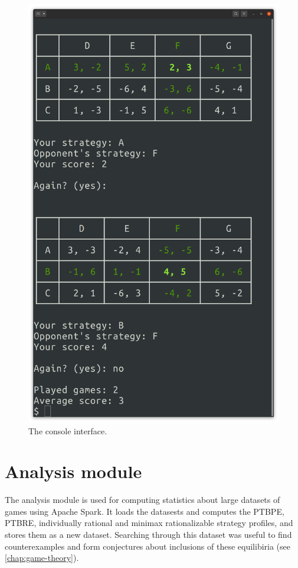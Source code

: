 \begin{figure}
	\centering
	\includegraphics[width=12cm]{fig/console.png}
	\caption{The console interface.}
	\label{fig:console-screen}
\end{figure}

\section{Analysis module}
The analysis module is used for computing statistics about large datasets of games using Apache Spark.
It loads the datasests and computes the PTBPE, PTBRE, individually rational and minimax rationalizable strategy profiles, and stores them as a new dataset.
Searching through this dataset was useful to find counterexamples and form conjectures about inclusions of these equilibiria (see \autoref{chap:game-theory}).
